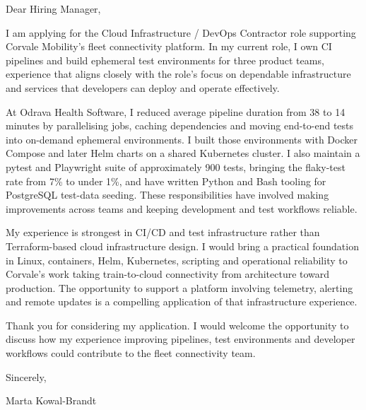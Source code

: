 \documentclass[11pt,a4paper]{article}
\begin{document}
Dear Hiring Manager,

I am applying for the Cloud Infrastructure / DevOps Contractor role supporting Corvale Mobility’s fleet connectivity platform. In my current role, I own CI pipelines and build ephemeral test environments for three product teams, experience that aligns closely with the role’s focus on dependable infrastructure and services that developers can deploy and operate effectively.

At Odrava Health Software, I reduced average pipeline duration from 38 to 14 minutes by parallelising jobs, caching dependencies and moving end-to-end tests into on-demand ephemeral environments. I built those environments with Docker Compose and later Helm charts on a shared Kubernetes cluster. I also maintain a pytest and Playwright suite of approximately 900 tests, bringing the flaky-test rate from 7\% to under 1\%, and have written Python and Bash tooling for PostgreSQL test-data seeding. These responsibilities have involved making improvements across teams and keeping development and test workflows reliable.

My experience is strongest in CI/CD and test infrastructure rather than Terraform-based cloud infrastructure design. I would bring a practical foundation in Linux, containers, Helm, Kubernetes, scripting and operational reliability to Corvale’s work taking train-to-cloud connectivity from architecture toward production. The opportunity to support a platform involving telemetry, alerting and remote updates is a compelling application of that infrastructure experience.

Thank you for considering my application. I would welcome the opportunity to discuss how my experience improving pipelines, test environments and developer workflows could contribute to the fleet connectivity team.

Sincerely,

Marta Kowal-Brandt
\end{document}
